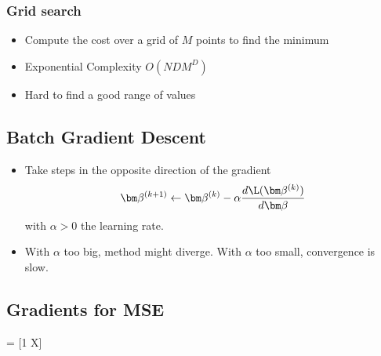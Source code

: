 
\subsubsection{Grid search}
\begin{itemize}
    \item Compute the cost over a grid of $M$ points to find the minimum
    \item Exponential Complexity $O(N D M^D)$
    \item Hard to find a good range of values
\end{itemize}


\subsection{Batch Gradient Descent}
\begin{itemize}
    \item Take steps in the opposite direction of the gradient
    $$ \bm \beta^{(k + 1)} \leftarrow \bm \beta^{(k)} - \alpha \frac{d \L (\bm \beta^{(k)})}{d \bm \beta}$$
    with $\alpha > 0$ the learning rate. 
    \item With $\alpha$ too big, method might diverge. With $\alpha$ too small, convergence is slow.
\end{itemize}


\subsection{Gradients for MSE}
\begin{myalign*}
     = [1 \hspace{5 pt} \*X]
\end{myalign*}

